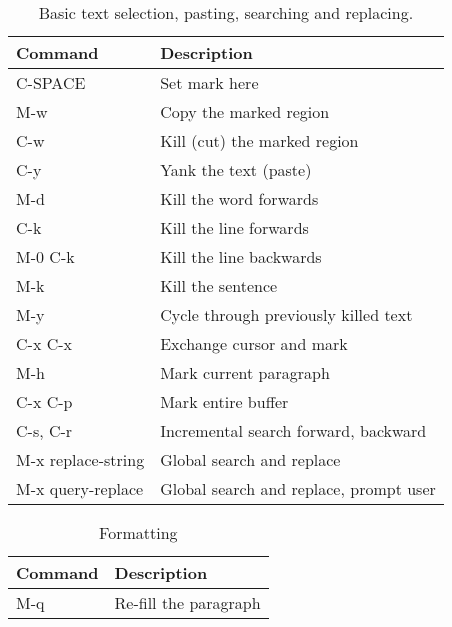 \documentclass[11pt, a4paper]{article}
\begin{document}
\begin{table}[!ht]
  \caption{Basic text selection, pasting, searching and replacing.}
  \begin{center}
    \begin{tabular}{l l}
      \hline
      Command        & Description \\
      \hline
      C-SPACE        & Set mark here \\
      M-w            & Copy the marked region \\
      C-w            & Kill (cut) the marked region \\
      C-y            & Yank the text (paste) \\
      M-d            & Kill the word forwards \\
      C-k            & Kill the line forwards \\
      M-0 C-k        & Kill the line backwards \\
      M-k            & Kill the sentence \\
      M-y            & Cycle through previously killed text \\
      C-x C-x        & Exchange cursor and mark \\
      M-h            & Mark current paragraph \\
      C-x C-p        & Mark entire buffer \\
      C-s, C-r       & Incremental search forward, backward \\
      M-x replace-string & Global search and replace \\
      M-x query-replace  & Global search and replace, prompt user \\
      \hline
    \end{tabular}
  \end{center}
\end{table}

\begin{table}[!ht]
  \caption{Formatting}
  \begin{center}
    \begin{tabular}{l l}
      \hline
      Command        &  Description \\
      \hline
      M-q            &  Re-fill the paragraph \\
      \hline
    \end{tabular}
  \end{center}
\end{table}
\end{document}
